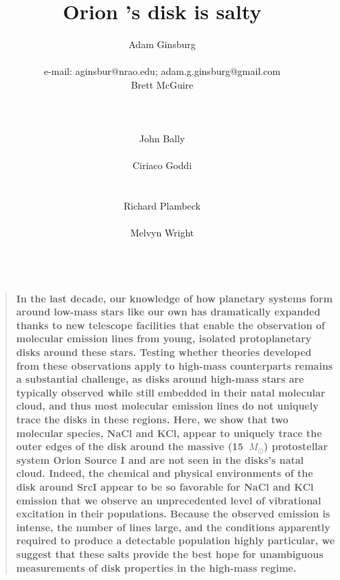 \documentclass[12pt]{article}
\date{}
\author{
Adam Ginsburg\\
\nraojansky\\
e-mail: aginsbur@nrao.edu; adam.g.ginsburg@gmail.com\\
Brett McGuire\\
\hubble\\
\nraocv\\
\cfa\\
John Bally\\
\casa\\
Ciriaco Goddi\\
\allegro\\
\radboud\\
Richard Plambeck\\
\berkeley\\
Melvyn Wright\\
\berkeley\\
}
\title{Orion \sourcei's disk is salty}
\newenvironment{sciabstract}{%
\begin{quote} \bf  }
{\end{quote}}
\newcommand{\bam}[1]{\textcolor{green!65!black}{\textbf{[BAM: #1]}}}
\newcommand{\sourcei}{SrcI\xspace}
\newcommand{\msun}{\ensuremath{M_{\odot}}\xspace}			%
\begin{document}


\maketitle

\begin{sciabstract}
 In the last decade, our knowledge of how planetary systems form around
 low-mass stars like our own has dramatically expanded thanks to new telescope
 facilities that enable the observation of molecular emission lines from young,
 isolated protoplanetary disks around these stars.  Testing whether theories
 developed from these observations apply to high-mass counterparts remains a
 substantial challenge, as disks around high-mass stars are typically observed
 while still embedded in their natal molecular cloud, and thus most molecular
 emission lines do not uniquely trace the disks in these regions. Here, we show
 that two molecular species, NaCl and KCl, appear to uniquely trace the outer
 edges of the disk around the massive (15~\msun) protostellar system Orion
 Source I and are not seen in the disks's natal cloud.  Indeed, the chemical
 and physical environments of the disk around \sourcei appear to be so
 favorable for NaCl and KCl emission that we observe an unprecedented level of
 vibrational excitation in their populations.  Because the observed emission is
 intense, the number of lines large, and the conditions apparently required to
 produce a detectable population highly particular, we suggest that these salts
 provide the best hope for unambiguous measurements of disk properties in the
 high-mass regime. 
\end{sciabstract}


%

 
\end{document}
